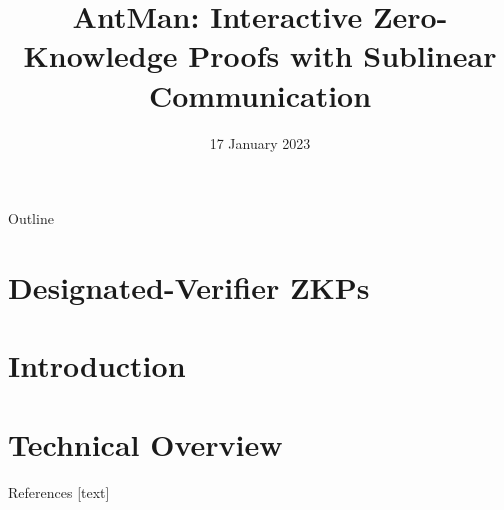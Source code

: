 \documentclass{beamer}
\title{AntMan: Interactive Zero-Knowledge Proofs with Sublinear Communication}
\date{17 January 2023}
\begin{document}
	\begin{frame}
		\titlepage
	\end{frame}
	
	\begin{frame}{Outline}
		\tableofcontents
	\end{frame}
	
	\section{Designated-Verifier ZKPs}
	
	
	\section{Introduction}
	
	
	\section{Technical Overview}
	
	
	\thankyouframe
	
	\begin{frame}[allowframebreaks]{References}
		
		
		
	\end{frame}
	
\end{document}
